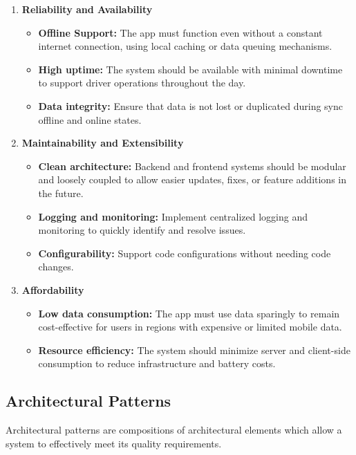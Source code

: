 \documentclass[a4paper,12pt]{article}
\begin{document}
\begin{enumerate}
    \item \textbf{Reliability and Availability}
    \begin{itemize}
        \item \textbf{Offline Support:} The app must function even without a constant internet connection, using local caching or data queuing mechanisms.
        \item \textbf{High uptime:} The system should be available with minimal downtime to support driver operations throughout the day.
        \item \textbf{Data integrity:} Ensure that data is not lost or duplicated during sync offline and online states.
    \end{itemize}

    \item \textbf{Maintainability and Extensibility}
    \begin{itemize}
        \item \textbf{Clean architecture:} Backend and frontend systems should be modular and loosely coupled to allow easier updates, fixes, or feature additions in the future.
        \item \textbf{Logging and monitoring:} Implement centralized logging and monitoring to quickly identify and resolve issues.
        \item \textbf{Configurability:} Support code configurations without needing code changes.
    \end{itemize}

    \item \textbf{Affordability}
    \begin{itemize}
        \item \textbf{Low data consumption:} The app must use data sparingly to remain cost-effective for users in regions with expensive or limited mobile data.
        \item \textbf{Resource efficiency:} The system should minimize server and client-side consumption to reduce infrastructure and battery costs.
    \end{itemize}
\end{enumerate}

\subsection{Architectural Patterns}
Architectural patterns are compositions of architectural elements which allow a system to effectively meet its quality requirements.
\end{document}
